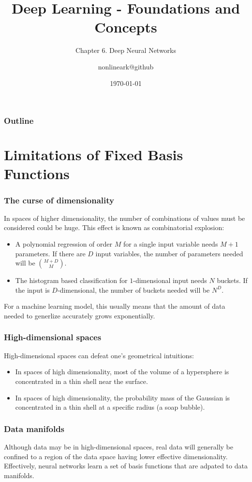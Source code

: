 \documentclass{beamer}
\title{Deep Learning - Foundations and Concepts}
\subtitle{Chapter 6. Deep Neural Networks}
\author{nonlineark@github}
\date{\today}
\begin{document}
\begin{frame}
    \titlepage
\end{frame}

\begin{frame}
    \frametitle{Outline}
    \tableofcontents
\end{frame}

\section{Limitations of Fixed Basis Functions}

\begin{frame}
    \frametitle{The curse of dimensionality}
    In spaces of higher dimensionality, the number of combinations of values must be considered could be huge. This effect is known as combinatorial explosion:
    \begin{itemize}
        \item A polynomial regression of order $M$ for a single input variable needs $M+1$ parameters. If there are $D$ input variables, the number of parameters needed will be $\binom{M+D}{M}$.
        \item The histogram based classification for $1$-dimensional input needs $N$ buckets. If the input is $D$-dimensional, the number of buckets needed will be $N^{D}$.
    \end{itemize}
    For a machine learning model, this usually means that the amount of data needed to generlize accurately grows exponentially.
\end{frame}

\begin{frame}
    \frametitle{High-dimensional spaces}
    High-dimensional spaces can defeat one's geometrical intuitions:
    \begin{itemize}
        \item In spaces of high dimensionality, most of the volume of a hypersphere is concentrated in a thin shell near the surface.
        \item In spaces of high dimensionality, the probability mass of the Gaussian is concentrated in a thin shell at a specific radius (a soap bubble).
    \end{itemize}
\end{frame}

\begin{frame}
    \frametitle{Data manifolds}
    Although data may be in high-dimensional spaces, real data will generally be confined to a region of the data space having lower effective dimensionality. Effectively, neural networks learn a set of basis functions that are adpated to data manifolds.
\end{frame}
\end{document}
